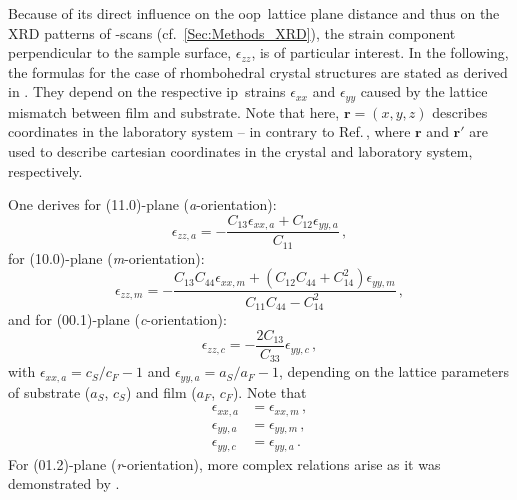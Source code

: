 Because of its direct influence on the \gls{oop}\ lattice plane distance and thus on the \gls{XRD} patterns of \thetaomega-scans (cf.~\ref{Sec:Methods_XRD}), the strain component perpendicular to the sample surface, $\epsilon_{zz}$, is of particular interest.
In the following, the formulas for the case of rhombohedral crystal structures are stated as derived in \textcite{grundmann2018}.
They depend on the respective \gls{ip}\ strains $\epsilon_{xx}$ and $\epsilon_{yy}$ caused by the lattice mismatch between film and substrate.
Note that here, $\mathbf{r}=(x,y,z)$ describes coordinates in the laboratory system -- in contrary to Ref.\,\cite{grundmann2018}, where $\mathbf{r}$ and $\mathbf{r}'$ are used to describe cartesian coordinates in the crystal and laboratory system, respectively.

One derives for (11.0)-plane (\textit{a}-orientation):
\begin{equation}
    \label{euq:e3-a}
    \epsilon_{zz,a}=-\frac{C_{13}\epsilon_{xx,a}+C_{12}\epsilon_{yy,a}}{C_{11}} \,,
\end{equation}
for (10.0)-plane (\textit{m}-orientation):
\begin{equation}
    \label{euq:e3-m}
    \epsilon_{zz,m}=-\frac{C_{13}C_{44}\epsilon_{xx,m}+(C_{12}C_{44}+C_{14}^2)\epsilon_{yy,m}}{C_{11}C_{44}-C_{14}^2} \,,
\end{equation}
and for (00.1)-plane (\textit{c}-orientation):
\begin{equation}
    \label{euq:e3-c}
    \epsilon_{zz,c}=-\frac{2C_{13}}{C_{33}}\epsilon_{yy,c} \,,
\end{equation}
with $\epsilon_{xx,a}=c_S/c_F-1$ and $\epsilon_{yy,a}=a_S/a_F-1$, depending on the lattice parameters of substrate ($a_S$, $c_S$) and film ($a_F$, $c_F$).
Note that 
\begin{align*}
    \epsilon_{xx,a}&= \epsilon_{xx,m}\,,\\
    \epsilon_{yy,a}&= \epsilon_{yy,m}\,,\\
    \epsilon_{yy,c}&= \epsilon_{yy,a}\,.
\end{align*}
For (01.2)-plane (\textit{r}-orientation), more complex relations arise as it was demonstrated by \textcite{grundmann2020}.
